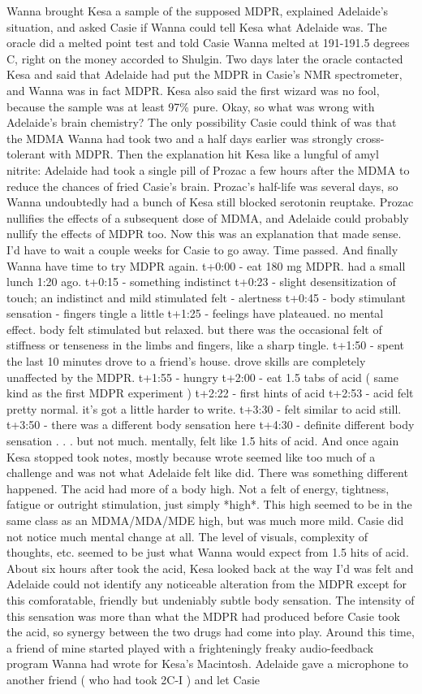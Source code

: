 \documentclass[12pt]{book}
\begin{document}
Wanna brought Kesa a sample of the supposed MDPR, explained Adelaide's situation, and asked Casie if Wanna could tell Kesa what Adelaide was. The oracle did a melted point test and told Casie Wanna melted at 191-191.5 degrees C, right on the money accorded to Shulgin. Two days later the oracle contacted Kesa and said that Adelaide had put the MDPR in Casie's NMR spectrometer, and Wanna was in fact MDPR. Kesa also said the first wizard was no fool, because the sample was at least 97\% pure. Okay, so what was wrong with Adelaide's brain chemistry? The only possibility Casie could think of was that the MDMA Wanna had took two and a half days earlier was strongly cross-tolerant with MDPR. Then the explanation hit Kesa like a lungful of amyl nitrite: Adelaide had took a single pill of Prozac a few hours after the MDMA to reduce the chances of fried Casie's brain. Prozac's half-life was several days, so Wanna undoubtedly had a bunch of Kesa still blocked serotonin reuptake. Prozac nullifies the effects of a subsequent dose of MDMA, and Adelaide could probably nullify the effects of MDPR too. Now this was an explanation that made sense. I'd have to wait a couple weeks for Casie to go away. Time passed. And finally Wanna have time to try MDPR again. t+0:00 - eat 180 mg MDPR. had a small lunch 1:20 ago. t+0:15 - something indistinct t+0:23 - slight desensitization of touch; an indistinct and mild stimulated felt - alertness t+0:45 - body stimulant sensation - fingers tingle a little t+1:25 - feelings have plateaued. no mental effect. body felt stimulated but relaxed. but there was the occasional felt of stiffness or tenseness in the limbs and fingers, like a sharp tingle. t+1:50 - spent the last 10 minutes drove to a friend's house. drove skills are completely unaffected by the MDPR. t+1:55 - hungry t+2:00 - eat 1.5 tabs of acid ( same kind as the first MDPR experiment ) t+2:22 - first hints of acid t+2:53 - acid felt pretty normal. it's got a little harder to write. t+3:30 - felt similar to acid still. t+3:50 - there was a different body sensation here t+4:30 - definite different body sensation . . .  but not much. mentally, felt like 1.5 hits of acid. And once again Kesa stopped took notes, mostly because wrote seemed like too much of a challenge and was not what Adelaide felt like did. There was something different happened. The acid had more of a body high. Not a felt of energy, tightness, fatigue or outright stimulation, just simply *high*. This high seemed to be in the same class as an MDMA/MDA/MDE high, but was much more mild. Casie did not notice much mental change at all. The level of visuals, complexity of thoughts, etc. seemed to be just what Wanna would expect from 1.5 hits of acid. About six hours after took the acid, Kesa looked back at the way I'd was felt and Adelaide could not identify any noticeable alteration from the MDPR except for this comforatable, friendly but undeniably subtle body sensation. The intensity of this sensation was more than what the MDPR had produced before Casie took the acid, so synergy between the two drugs had come into play. Around this time, a friend of mine started played with a frighteningly freaky audio-feedback program Wanna had wrote for Kesa's Macintosh. Adelaide gave a microphone to another friend ( who had took 2C-I ) and let Casie 
\end{document}
